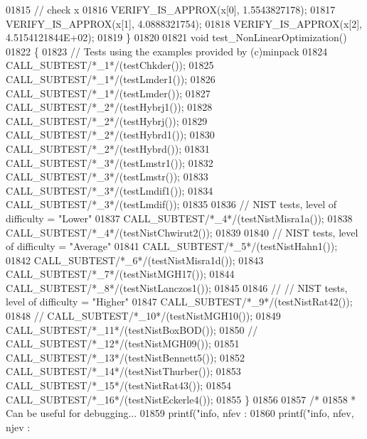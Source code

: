 \begin{DoxyCode}
01815   \textcolor{comment}{// check x}
01816   VERIFY\_IS\_APPROX(x[0], 1.5543827178);
01817   VERIFY\_IS\_APPROX(x[1], 4.0888321754);
01818   VERIFY\_IS\_APPROX(x[2], 4.5154121844E+02);
01819 \}
01820 
01821 \textcolor{keywordtype}{void} test\_NonLinearOptimization()
01822 \{
01823     \textcolor{comment}{// Tests using the examples provided by (c)minpack}
01824     CALL\_SUBTEST\textcolor{comment}{/*\_1*/}(testChkder());
01825     CALL\_SUBTEST\textcolor{comment}{/*\_1*/}(testLmder1());
01826     CALL\_SUBTEST\textcolor{comment}{/*\_1*/}(testLmder());
01827     CALL\_SUBTEST\textcolor{comment}{/*\_2*/}(testHybrj1());
01828     CALL\_SUBTEST\textcolor{comment}{/*\_2*/}(testHybrj());
01829     CALL\_SUBTEST\textcolor{comment}{/*\_2*/}(testHybrd1());
01830     CALL\_SUBTEST\textcolor{comment}{/*\_2*/}(testHybrd());
01831     CALL\_SUBTEST\textcolor{comment}{/*\_3*/}(testLmstr1());
01832     CALL\_SUBTEST\textcolor{comment}{/*\_3*/}(testLmstr());
01833     CALL\_SUBTEST\textcolor{comment}{/*\_3*/}(testLmdif1());
01834     CALL\_SUBTEST\textcolor{comment}{/*\_3*/}(testLmdif());
01835 
01836     \textcolor{comment}{// NIST tests, level of difficulty = "Lower"}
01837     CALL\_SUBTEST\textcolor{comment}{/*\_4*/}(testNistMisra1a());
01838     CALL\_SUBTEST\textcolor{comment}{/*\_4*/}(testNistChwirut2());
01839 
01840     \textcolor{comment}{// NIST tests, level of difficulty = "Average"}
01841     CALL\_SUBTEST\textcolor{comment}{/*\_5*/}(testNistHahn1());
01842     CALL\_SUBTEST\textcolor{comment}{/*\_6*/}(testNistMisra1d());
01843     CALL\_SUBTEST\textcolor{comment}{/*\_7*/}(testNistMGH17());
01844     CALL\_SUBTEST\textcolor{comment}{/*\_8*/}(testNistLanczos1());
01845 
01846 \textcolor{comment}{//     // NIST tests, level of difficulty = "Higher"}
01847     CALL\_SUBTEST\textcolor{comment}{/*\_9*/}(testNistRat42());
01848 \textcolor{comment}{//     CALL\_SUBTEST/*\_10*/(testNistMGH10());}
01849     CALL\_SUBTEST\textcolor{comment}{/*\_11*/}(testNistBoxBOD());
01850 \textcolor{comment}{//     CALL\_SUBTEST/*\_12*/(testNistMGH09());}
01851     CALL\_SUBTEST\textcolor{comment}{/*\_13*/}(testNistBennett5());
01852     CALL\_SUBTEST\textcolor{comment}{/*\_14*/}(testNistThurber());
01853     CALL\_SUBTEST\textcolor{comment}{/*\_15*/}(testNistRat43());
01854     CALL\_SUBTEST\textcolor{comment}{/*\_16*/}(testNistEckerle4());
01855 \}
01856 
01857 \textcolor{comment}{/*}
01858 \textcolor{comment}{ * Can be useful for debugging...}
01859 \textcolor{comment}{  printf("info, nfev : %
01860 \textcolor{comment}{  printf("info, nfev, njev : %
}}
\end{DoxyCode}
